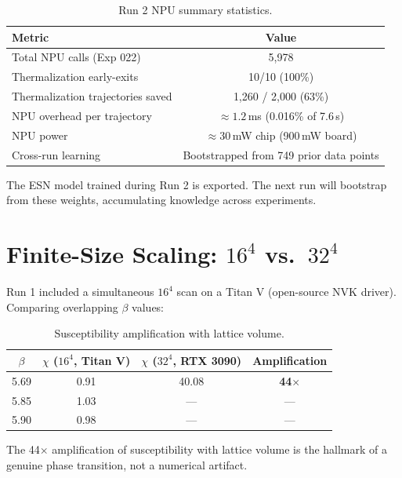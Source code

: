 \documentclass[11pt,a4paper]{article}
\begin{document}
\begin{table}[H]
\centering
\caption{Run 2 NPU summary statistics.}
\label{tab:npu_stats}
\renewcommand{\arraystretch}{1.25}
\begin{tabular}{lc}
\toprule
Metric & Value \\
\midrule
Total NPU calls (Exp 022)           & 5,978 \\
Thermalization early-exits          & 10/10 (100\%) \\
Thermalization trajectories saved   & 1,260 / 2,000 (63\%) \\
NPU overhead per trajectory         & $\approx 1.2$\,ms (0.016\% of 7.6\,s) \\
NPU power                           & $\approx 30$\,mW chip (900\,mW board) \\
Cross-run learning                  & Bootstrapped from 749 prior data points \\
\bottomrule
\end{tabular}
\end{table}

The ESN model trained during Run 2 is exported.  The next run will bootstrap
from these weights, accumulating knowledge across experiments.

\FloatBarrier
\section{Finite-Size Scaling: $16^4$ vs.\ $32^4$}

Run 1 included a simultaneous $16^4$ scan on a Titan V (open-source NVK
driver).  Comparing overlapping $\beta$ values:

\begin{table}[H]
\centering
\caption{Susceptibility amplification with lattice volume.}
\label{tab:fss}
\renewcommand{\arraystretch}{1.25}
\begin{tabular}{cccc}
\toprule
$\beta$ & $\chi$ ($16^4$, Titan V) & $\chi$ ($32^4$, RTX 3090) & Amplification \\
\midrule
5.69 & 0.91 & 40.08 & \textbf{44$\times$} \\
5.85 & 1.03 & ---   & --- \\
5.90 & 0.98 & ---   & --- \\
\bottomrule
\end{tabular}
\end{table}

The 44$\times$ amplification of susceptibility with lattice volume is the
hallmark of a genuine phase transition, not a numerical artifact.
\end{document}
